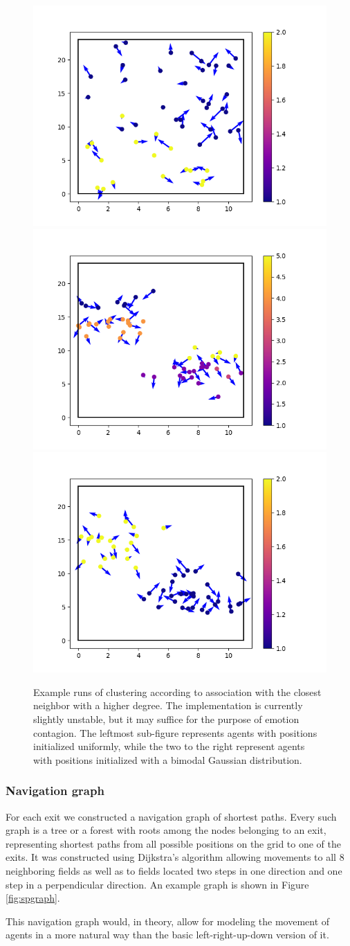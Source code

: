 \documentclass[9pt]{pnas-new}
\begin{document}
\begin{figure}[h!]
    \centering
    \includegraphics[width=0.3\linewidth]{fig/Figure_2.png}
    \hfill
    \includegraphics[width=0.3\linewidth]{fig/Figure_3.png}
    \hfill
    \includegraphics[width=0.3\linewidth]{fig/Figure_4.png}
    \caption{Example runs of clustering according to association with the closest neighbor with a higher degree. The implementation is currently slightly unstable, but it may suffice for the purpose of emotion contagion. The leftmost sub-figure represents agents with positions initialized uniformly, while the two to the right represent agents with positions initialized with a bimodal Gaussian distribution.}
    \label{fig:enter-label}
\end{figure}

\subsubsection{Navigation graph}

For each exit we constructed a navigation graph of shortest paths. Every such graph is a tree or a forest with roots among the nodes belonging to an exit, representing shortest paths from all possible positions on the grid to one of the exits. It was constructed using Dijkstra's algorithm allowing movements to all 8 neighboring fields as well 
as to fields located two steps in one direction and one step in a perpendicular direction.
An example graph is shown in Figure \ref{fig:spgraph}.

This navigation graph would, in theory, allow for modeling the movement of agents in a more natural way than the basic left-right-up-down version of it.
\end{document}

